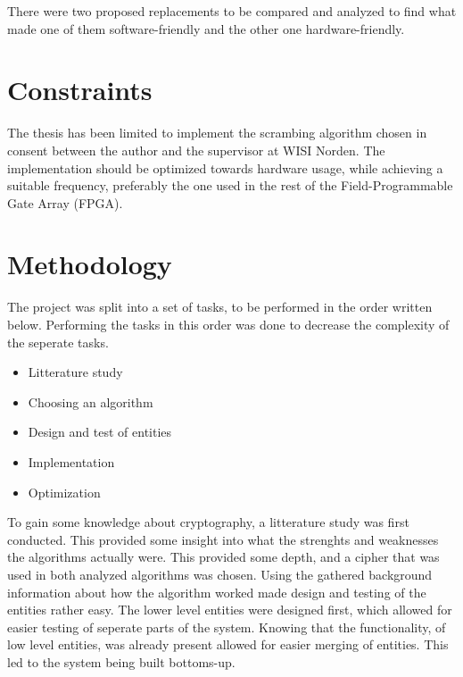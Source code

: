 There were two proposed replacements to be compared and analyzed 
to find what made one of them software-friendly and the other one 
hardware-friendly. 

\section{Constraints}
The thesis has been limited to implement the scrambing algorithm chosen 
in consent between the author and the supervisor at WISI Norden. The 
implementation should be optimized towards hardware usage, while 
achieving a suitable frequency, preferably the one used in the rest of 
the Field-Programmable Gate Array (FPGA).


\section{Methodology}
The project was split into a set of tasks, to be performed in the order 
written below. Performing the tasks in this order was done to decrease 
the complexity of the seperate tasks.

\begin{itemize}
\item Litterature study
\item Choosing an algorithm
\item Design and test of entities
\item Implementation
\item Optimization
\end{itemize}

To gain some knowledge about cryptography, a litterature study was 
first conducted. This provided some insight into what the strenghts and 
weaknesses the algorithms actually were. This provided some depth, and 
a cipher that was used in both analyzed algorithms was chosen. Using 
the gathered background information about how the algorithm worked made 
design and testing of the entities rather easy. The lower level 
entities were designed first, which allowed for easier testing of 
seperate parts of the system. 
Knowing that the functionality, of low level entities, was already 
present allowed for easier merging of entities. This led to the system 
being built bottoms-up.


